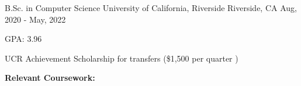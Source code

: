 
\begin{cventries}
  \cventry
    {B.Sc. in Computer Science} %
    {University of California, Riverside} %
    {Riverside, CA} %
    {Aug, 2020 -  May, 2022} %
    {
      \begin{cvitems} %
        \item {GPA: 3.96}
        \item {UCR Achievement Scholarship for transfers (\$1,500 per quarter )}
        \item []{\textbf{Relevant Coursework:}}
        \item []{
            \begin{flushleft}
            \end{flushleft}
        }
      \end{cvitems}
    }

\end{cventries}
